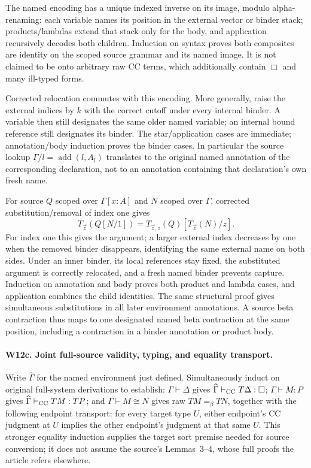 The named encoding has a unique indexed inverse on its image, modulo
alpha-renaming: each variable names its position in the external vector
or binder stack; products/lambdas extend that stack only for the body,
and application recursively decodes both children. Induction on syntax
proves both composites are identity on the scoped source grammar and
its named image. It is not claimed to be onto arbitrary raw CC terms,
which additionally contain \(\Box\) and many ill-typed forms.

Corrected relocation commutes with this encoding. More generally, raise
the external indices by \(k\) with the correct cutoff under every
internal binder. A variable then still designates the same older named
variable; an internal bound reference still designates its binder.
The star/application cases are immediate; annotation/body induction
proves the binder cases. In particular the source lookup
\(\Gamma/l=\operatorname{add}(l,A_l)\) translates to the
original named annotation of the corresponding declaration, not to
an annotation containing that declaration's own fresh name.

For source \(Q\) scoped over \(\Gamma[x:A]\) and \(N\) scoped
over \(\Gamma\), corrected substitution/removal of index one gives
\[
 T_{\vec z}(Q[N/1])
   =T_{\vec z,z}(Q)[T_{\vec z}(N)/z].
\]
For index one this gives the argument; a larger external index decreases
by one when the removed binder disappears, identifying the same external
name on both sides. Under an inner binder, its local references stay
fixed, the substituted argument is correctly relocated, and a fresh
named binder prevents capture. Induction on annotation and body proves
both product and lambda cases, and application combines the child
identities. The same structural proof gives simultaneous substitutions
in all later environment annotations. A source beta contraction thus
maps to one designated named beta contraction at the same position,
including a contraction in a binder annotation or product body.

\paragraph{W12c. Joint full-source validity, typing, and equality transport.}
Write \(\widehat\Gamma\) for the named environment just defined.
Simultaneously induct on original full-system derivations to establish:
\(\Gamma\vdash\Delta\) gives
\(\widehat\Gamma\vdash_{\rm CC}T\Delta:\Box\);
\(\Gamma\vdash M:P\) gives
\(\widehat\Gamma\vdash_{\rm CC}TM:TP\);
and \(\Gamma\vdash M\cong N\) gives raw
\(TM=_\beta TN\), together with the following endpoint transport:
for every target type \(U\), either endpoint's CC judgment at \(U\)
implies the other endpoint's judgment at that same \(U\).
This stronger equality induction supplies the target sort premise needed
for source conversion; it does not assume the source's Lemmas~3--4,
whose full proofs the article refers elsewhere.

